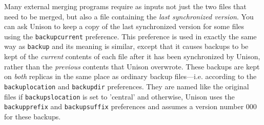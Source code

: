 \documentclass{article}
\begin{document}
Many external merging programs require as inputs not just the two files that
need to be merged, but also a file containing the {\em last synchronized
  version}.  You can ask Unison to keep a copy of the last synchronized
version for some files using the \verb|backupcurrent| preference. This
preference is used in exactly the same way as \verb|backup| and its meaning
is similar, except that it causes backups to be kept of the {\em current}
contents of each file after it has been synchronized by Unison, rather than
the {\em previous} contents that Unison overwrote.  These backups are kept
on {\em both} replicas in the same place as ordinary backup files---i.e.
according to the \verb|backuplocation| and \verb|backupdir| preferences.
They are named like the original files if \verb|backupslocation| is set to
'central' and otherwise, Unison uses the \verb|backupprefix| and
\verb|backupsuffix| preferences and assumes a version number 000 for these
backups.
\end{document}
